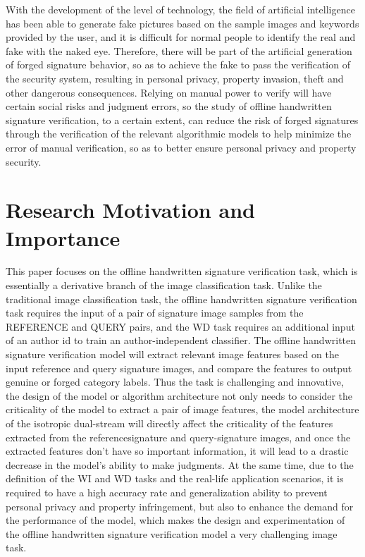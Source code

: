 With the development of the level of technology, the field of artificial intelligence has been able to generate fake pictures based on the sample images and keywords provided by the user, and it is difficult for normal people to identify the real and fake with the naked eye. Therefore, there will be part of the artificial generation of forged signature behavior, so as to achieve the fake to pass the verification of the security system, resulting in personal privacy, property invasion, theft and other dangerous consequences. Relying on manual power to verify will have certain social risks and judgment errors, so the study of offline handwritten signature verification, to a certain extent, can reduce the risk of forged signatures through the verification of the relevant algorithmic models to help minimize the error of manual verification, so as to better ensure personal privacy and property security.

\section{Research Motivation and Importance}

This paper focuses on the offline handwritten signature verification task, which is essentially a derivative branch of the image classification task. Unlike the traditional image classification task, the offline handwritten signature verification task requires the input of a pair of signature image samples from the REFERENCE and QUERY pairs, and the WD task requires an additional input of an author id to train an author-independent classifier. The offline handwritten signature verification model will extract relevant image features based on the input reference and query signature images, and compare the features to output genuine or forged category labels. Thus the task is challenging and innovative, the design of the model or algorithm architecture not only needs to consider the criticality of the model to extract a pair of image features, the model architecture of the isotropic dual-stream will directly affect the criticality of the features extracted from the referencesignature and query-signature images, and once the extracted features don't have so important information, it will lead to a drastic decrease in the model's ability to make judgments. At the same time, due to the definition of the WI and WD tasks and the real-life application scenarios, it is required to have a high accuracy rate and generalization ability to prevent personal privacy and property infringement, but also to enhance the demand for the performance of the model, which makes the design and experimentation of the offline handwritten signature verification model a very challenging image task.

